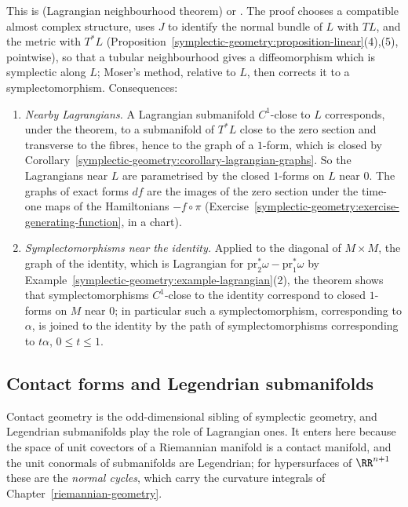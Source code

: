 This is \cite{cannas-da-silva} (Lagrangian neighbourhood theorem) or \cite{mcduff-salamon}. The proof chooses a compatible almost complex structure, uses $J$ to identify the normal bundle of $L$ with $TL$, and the
metric with $T^*L$ (Proposition~\ref{symplectic-geometry:proposition-linear}(4),(5), pointwise), so that a tubular neighbourhood gives a diffeomorphism which is symplectic along $L$; Moser's method, relative to
$L$, then corrects it to a symplectomorphism. Consequences:
\begin{enumerate}
\item \emph{Nearby Lagrangians.} A Lagrangian submanifold $C^1$-close to $L$ corresponds, under the theorem, to a submanifold of $T^*L$ close to the zero section and transverse to the fibres, hence to the graph of a
$1$-form, which is closed by Corollary~\ref{symplectic-geometry:corollary-lagrangian-graphs}. So the Lagrangians near $L$ are parametrised by the closed $1$-forms on $L$ near $0$. The graphs of exact forms
$df$ are the images of the zero section under the time-one maps of the Hamiltonians $-f \circ \pi$ (Exercise~\ref{symplectic-geometry:exercise-generating-function}, in a chart).
\item \emph{Symplectomorphisms near the identity.} Applied to the diagonal of $M \times M$, the graph of the identity, which is Lagrangian for $\mathrm{pr}_2^*\omega - \mathrm{pr}_1^*\omega$ by
Example~\ref{symplectic-geometry:example-lagrangian}(2), the theorem shows that symplectomorphisms $C^1$-close to the identity correspond to closed $1$-forms on $M$ near $0$; in particular such a
symplectomorphism, corresponding to $\alpha$, is joined to the identity by the path of symplectomorphisms corresponding to $t\alpha$, $0 \leq t \leq 1$.
\end{enumerate}

\subsection{Contact forms and Legendrian submanifolds}\label{symplectic-geometry:subsection-contact}

Contact geometry is the odd-dimensional sibling of symplectic geometry, and Legendrian submanifolds play the role of Lagrangian ones. It enters here because the space of unit covectors of a Riemannian
manifold is a contact manifold, and the unit conormals of submanifolds are Legendrian; for hypersurfaces of $\RR^{n+1}$ these are the \emph{normal cycles}, which carry the curvature integrals of
Chapter~\ref{riemannian-geometry}.

